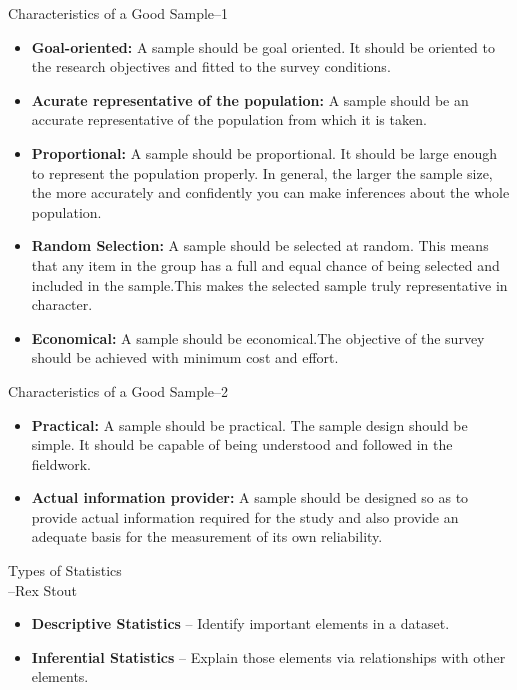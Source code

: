 \begin{frame}[t]{Characteristics of a Good Sample--1}
	\begin{itemize}
		\item \textbf{Goal-oriented:} A sample should be goal oriented. It 
		should be oriented to the research objectives and fitted to the survey 
		conditions. \pause 
		\item \textbf{Acurate representative of the population:} A sample 
		should be an accurate representative of the population from which it is 
		taken. \pause
		\item \textbf{Proportional:} A sample should be proportional. It should 
		be large enough to represent the population properly. In general, the 
		larger the sample size, the more accurately and confidently 
		you can make inferences about the whole population.\pause 
		
		\item \textbf{Random Selection:} A sample should be selected at random. 
		This means that any item in the group has a full and equal chance of 
		being selected and included in the sample.This makes the selected 
		sample truly representative in character. \pause 
		\item \textbf{Economical:} A sample should be economical.The objective 
		of the survey should be achieved with minimum cost and effort. 
		
	\end{itemize}
\end{frame}

\begin{frame}[t]{Characteristics of a Good Sample--2}
	\begin{itemize}
		\item \textbf{Practical:} A sample should be practical. The sample 
		design should be simple. It should be capable of being understood and 
		followed in the fieldwork. \pause 
		\item \textbf{Actual information provider:} A sample should be designed 
		so as to provide actual information required for the study and also 
		provide an adequate basis for the measurement of its own reliability. 
		\pause
	\end{itemize}
\end{frame}


\begin{frame}[t]{Types of Statistics}
	 \\ 
	    --Rex Stout
	\begin{itemize}
		\item \textbf{Descriptive Statistics} -- Identify important elements in 
		a
		dataset.
		\item \textbf{Inferential Statistics} -- Explain those elements via
		relationships with other elements.
	\end{itemize}
\end{frame} 

